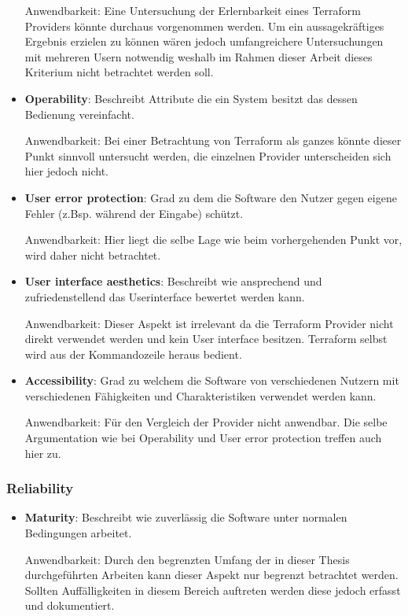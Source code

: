 \begin{spacing}{1.2}
\begin{itemize}
  Anwendbarkeit: Eine Untersuchung der Erlernbarkeit eines Terraform 
  Providers könnte durchaus vorgenommen werden. Um ein aussagekräftiges
  Ergebnis erzielen zu können wären jedoch umfangreichere Untersuchungen
  mit mehreren Usern notwendig weshalb im Rahmen dieser Arbeit dieses
  Kriterium nicht betrachtet werden soll.

  \item \textbf{Operability}: Beschreibt Attribute die ein System besitzt
  das dessen Bedienung vereinfacht.

  Anwendbarkeit: Bei einer Betrachtung von Terraform als ganzes könnte
  dieser Punkt sinnvoll untersucht werden, die einzelnen Provider
  unterscheiden sich hier jedoch nicht.

  \item \textbf{User error protection}: Grad zu dem die Software den
  Nutzer gegen eigene Fehler (z.Bsp. während der Eingabe) schützt.

  Anwendbarkeit: Hier liegt die selbe Lage wie beim vorhergehenden
  Punkt vor, wird daher nicht betrachtet.

  \item \textbf{User interface aesthetics}: Beschreibt wie ansprechend
  und zufriedenstellend das Userinterface bewertet werden kann.
  
  Anwendbarkeit: Dieser Aspekt ist irrelevant da die Terraform Provider
  nicht direkt verwendet werden und kein User interface besitzen.
  Terraform selbst wird aus der Kommandozeile heraus bedient.

  \item \textbf{Accessibility}: Grad zu welchem die Software von
  verschiedenen Nutzern mit verschiedenen Fähigkeiten und Charakteristiken
  verwendet werden kann.

  Anwendbarkeit: Für den Vergleich der Provider nicht anwendbar. Die 
  selbe Argumentation wie bei Operability und User error protection
  treffen auch hier zu. 
\end{itemize}

\subsubsection{Reliability}

\begin{itemize}
  \item \textbf{Maturity}: Beschreibt wie zuverlässig die Software unter
  normalen Bedingungen arbeitet.

  Anwendbarkeit: Durch den begrenzten Umfang der in dieser Thesis
  durchgeführten Arbeiten kann dieser Aspekt nur begrenzt betrachtet
  werden. Sollten Auffälligkeiten in diesem Bereich auftreten werden
  diese jedoch erfasst und dokumentiert.


\end{itemize}
\end{spacing}
